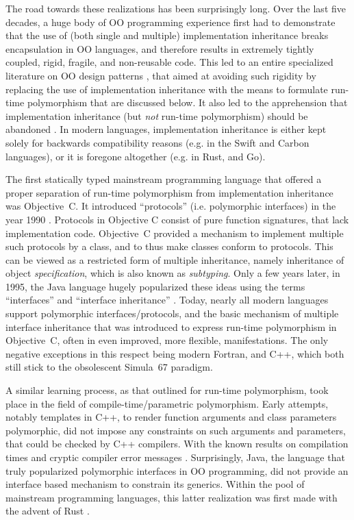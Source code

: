 \documentclass[11pt,oneside]{report}
\begin{document}
The road towards these realizations has been surprisingly long. Over
the last five decades, a huge body of OO programming experience first
had to demonstrate that the use of (both single and multiple)
implementation inheritance breaks encapsulation in OO languages, and
therefore results in extremely tightly coupled, rigid, fragile, and
non-reusable code. This led to an entire specialized literature on OO
design patterns \cite{Gamma_et_al_94,Martin_03,Holub_04}, that aimed
at avoiding such rigidity by replacing the use of implementation
inheritance with the means to formulate run-time polymorphism that are
discussed below. It also led to the apprehension that implementation
inheritance (but \emph{not} run-time polymorphism) should be abandoned
\cite{Weck_Szyperski}. In modern languages, implementation inheritance
is either kept solely for backwards compatibility reasons (e.g. in the
Swift and Carbon languages), or it is foregone altogether (e.g. in
Rust, and Go).

The first statically typed mainstream programming language that
offered a proper separation of run-time polymorphism from
implementation inheritance was Objective~C. It introduced
``protocols'' (i.e. polymorphic interfaces) in the year 1990
\cite{Cox_et_al_20}. Protocols in Objective C consist of pure function
signatures, that lack implementation code. Objective~C provided a
mechanism to implement multiple such protocols by a class, and to thus
make classes conform to protocols. This can be viewed as a restricted
form of multiple inheritance, namely inheritance of object
\emph{specification}, which is also known as \emph{subtyping}. Only a
few years later, in 1995, the Java language hugely popularized these
ideas using the terms ``interfaces'' and ``interface inheritance''
\cite{Cox_et_al_20}. Today, nearly all modern languages support
polymorphic interfaces/protocols, and the basic mechanism of multiple
interface inheritance that was introduced to express run-time
polymorphism in Objective~C, often in even improved, more flexible,
manifestations. The only negative exceptions in this respect being
modern Fortran, and C++, which both still stick to the obsolescent
Simula~67 paradigm.

A similar learning process, as that outlined for run-time
polymorphism, took place in the field of compile-time/parametric
polymorphism. Early attempts, notably templates in C++, to render
function arguments and class parameters polymorphic, did not impose
any constraints on such arguments and parameters, that could be
checked by C++ compilers. With the known results on compilation times
and cryptic compiler error messages
\cite{Haveraaen_et_al_19}. Surprisingly, Java, the language that truly
popularized polymorphic interfaces in OO programming, did not provide
an interface based mechanism to constrain its generics. Within the
pool of mainstream programming languages, this latter realization was
first made with the advent of Rust \cite{Matsakis_2014}.
\end{document}

